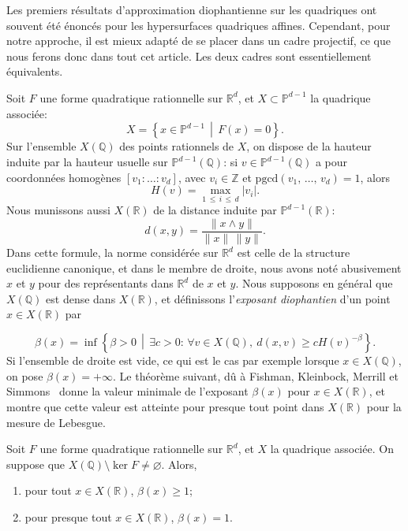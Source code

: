 \documentclass[AHL,Unicode,longabstracts,francais,published]{cedram}
\newcommand{\R}{\mathbb{R}}
\newcommand{\Z}{\mathbb{Z}}
\newcommand{\Q}{\mathbb{Q}}
\newcommand{\PP}{\mathbb{P}}
\newcommand{\pgcd}{\mathrm{pgcd}}
\let\oldexists\exists
\renewcommand*{\exists}{\mathrel{\oldexists}}
\let\oldforall\forall
\renewcommand*{\forall}{\mathrel{\oldforall}}
\begin{document}

Les premiers résultats d'approximation diophantienne sur les quadriques ont souvent été énoncés pour les hypersurfaces quadriques affines. Cependant, pour notre approche, il est mieux adapté de se placer dans un cadre projectif, ce que nous ferons donc dans tout cet article. Les deux cadres sont essentiellement équivalents.

Soit $F$ une forme quadratique rationnelle sur $\R^d$, et $X\subset\PP^{d-1}$ la quadrique associée:
\[
X = \left\{x\in\PP^{d-1}\, \middle|\, F(x)=0\right\}.
\]
Sur l'ensemble $X(\Q)$ des points rationnels de $X$, on dispose de la hauteur induite par la hauteur usuelle sur $\PP^{d-1}(\Q)$: si $v\in\PP^{d-1}(\Q)$ a pour coordonnées homogènes $[v_1:\dots:v_d]$, avec $v_i\in\Z$ et $\pgcd(v_1,\,\dots,\,v_d)=1$, alors
\[
H(v) = \max_{1\,\leq\,i\,\leq\,d} \left|v_i\right|.
\]
Nous munissons aussi $X(\R)$ de la distance induite par $\PP^{d-1}(\R)$:
\[
d(x,y) = \frac{\|x\wedge y\|}{\|x\|\,\|y\|}.
\]
Dans cette formule, la norme considérée sur $\R^d$ est celle de la structure euclidienne canonique, et dans le membre de droite, nous avons noté abusivement $x$ et $y$ pour des représentants dans $\R^d$ de $x$ et $y$. Nous supposons en général que $X(\Q)$ est dense dans $X(\R)$, et définissons l'\emph{exposant diophantien} d'un point $x\in X(\R)$ par

\[
\beta(x) = \inf\left\{\beta>0\, \middle|\, \exists c>0:\,\forall v\in X(\Q),\ d(x,v)\geq cH(v)^{-\beta}\right\}.
\]
Si l'ensemble de droite est vide, ce qui est le cas par exemple lorsque $x\in X(\Q)$, on pose $\beta(x)=+\infty$. Le théorème suivant, dû à Fishman, Kleinbock, Merrill et Simmons~\cite{fkms_quadric} donne la valeur minimale de l'exposant $\beta(x)$ pour $x\in X(\R)$, et montre que cette valeur est atteinte pour presque tout point dans $X(\R)$ pour la mesure de Lebesgue.

\begin{theo}
Soit $F$ une forme quadratique rationnelle sur $\R^d$, et $X$ la quadrique associée. On suppose que $X(\Q)\setminus\ker F\neq\varnothing$. Alors,
\begin{enumerate}
\item pour tout $x\in X(\R)$, $\beta(x)\geq 1$;
\item pour presque tout $x\in X(\R)$, $\beta(x) = 1$.
\end{enumerate}
\end{theo}
\end{document}
